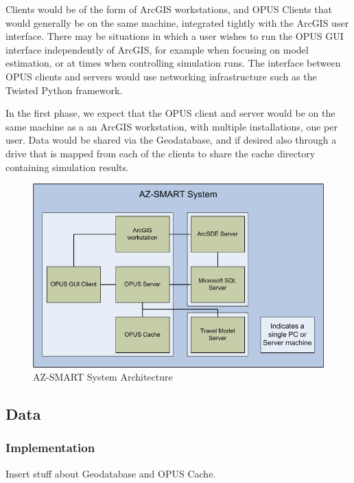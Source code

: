 \documentclass[titlepage]{article}
\begin{document}
Clients would be of the form of ArcGIS workstations, and OPUS Clients that would generally be on the same machine, integrated tightly with the ArcGIS user interface.  There may be situations in which a user wishes to run the OPUS GUI interface independently of ArcGIS, for example when focusing on model estimation, or at times when controlling simulation runs.  The interface between OPUS clients and servers would use networking infrastructure such as the Twisted Python framework.  

In the first phase, we expect that the OPUS client and server would be on the same machine as a an ArcGIS workstation, with multiple installations, one per user.  Data would be shared via the Geodatabase, and if desired also through a drive that is mapped from each of the clients to share the cache directory containing simulation results.


\begin{figure}[h]
\begin{center}
\includegraphics[scale=0.5]{figures/AZ-SMART_system_diagram.png}
\caption{AZ-SMART System Architecture}
\label{figSystem}
\end{center}
\end{figure}



\subsection{Data}

\subsubsection{Implementation}
Insert stuff about Geodatabase and OPUS Cache.
\end{document}
